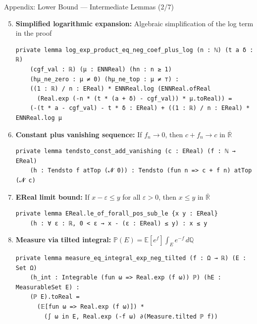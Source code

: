 \documentclass[aspectratio=169]{beamer}
\newcommand{\E}{\mathbb{E}}
\renewcommand{\P}{\mathbb{P}}
\newcommand{\Q}{\mathbb{Q}}
\newcommand{\R}{\mathbb{R}}
\begin{document}
\begin{frame}[fragile]{Appendix: Lower Bound --- Intermediate Lemmas (2/7)}
  \begin{enumerate}\setcounter{enumi}{4}
    \item \textbf{Simplified logarithmic expansion:} Algebraic simplification of the log term in the proof
\begin{lstlisting}[basicstyle=\ttfamily\tiny]
private lemma log_exp_product_eq_neg_coef_plus_log (n : ℕ) (t a δ : ℝ)
    (cgf_val : ℝ) (μ : ENNReal) (hn : n ≥ 1)
    (hμ_ne_zero : μ ≠ 0) (hμ_ne_top : μ ≠ ⊤) :
    ((1 : ℝ) / n : EReal) * ENNReal.log (ENNReal.ofReal
      (Real.exp (-n * (t * (a + δ) - cgf_val)) * μ.toReal)) =
    (-(t * a - cgf_val) - t * δ : EReal) + ((1 : ℝ) / n : EReal) * ENNReal.log μ
\end{lstlisting}
    \item \textbf{Constant plus vanishing sequence:} If $f_n \to 0$, then $c + f_n \to c$ in $\overline{\R}$
\begin{lstlisting}[basicstyle=\ttfamily\tiny]
private lemma tendsto_const_add_vanishing (c : EReal) (f : ℕ → EReal)
    (h : Tendsto f atTop (𝓝 0)) : Tendsto (fun n => c + f n) atTop (𝓝 c)
\end{lstlisting}
    \item \textbf{EReal limit bound:} If $x - \varepsilon \le y$ for all $\varepsilon > 0$, then $x \le y$ in $\overline{\R}$
\begin{lstlisting}[basicstyle=\ttfamily\tiny]
private lemma EReal.le_of_forall_pos_sub_le {x y : EReal}
    (h : ∀ ε : ℝ, 0 < ε → x - (ε : EReal) ≤ y) : x ≤ y
\end{lstlisting}
    \item \textbf{Measure via tilted integral:} $\P(E) = \E[e^f] \int_E e^{-f}\, d\Q$
\begin{lstlisting}[basicstyle=\ttfamily\tiny]
private lemma measure_eq_integral_exp_neg_tilted (f : Ω → ℝ) (E : Set Ω)
    (h_int : Integrable (fun ω => Real.exp (f ω)) ℙ) (hE : MeasurableSet E) :
    (ℙ E).toReal =
      (𝔼[fun ω => Real.exp (f ω)]) *
        (∫ ω in E, Real.exp (-f ω) ∂(Measure.tilted ℙ f))
\end{lstlisting}
  \end{enumerate}
\end{frame}
\end{document}
